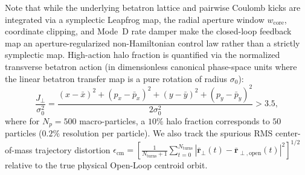 \documentclass[11pt,a4paper]{article}
\begin{document}
Note that while the underlying betatron lattice and pairwise Coulomb kicks are integrated via a symplectic Leapfrog map, the radial aperture window $w_{\mathrm{core}}$, coordinate clipping, and Mode~D rate damper make the closed-loop feedback map an aperture-regularized non-Hamiltonian control law rather than a strictly symplectic map. High-action halo fraction is quantified via the normalized transverse betatron action (in dimensionless canonical phase-space units where the linear betatron transfer map is a pure rotation of radius $\sigma_0$):
\begin{equation}
    \frac{J_\perp}{\sigma_0^2} = \frac{(x - \bar{x})^2 + (p_x - \bar{p}_x)^2 + (y - \bar{y})^2 + (p_y - \bar{p}_y)^2}{2\sigma_0^2} > 3.5,
    \label{eq:halo_action_def}
\end{equation}
where for $N_p = 500$ macro-particles, a $10\%$ halo fraction corresponds to $50$ particles ($0.2\%$ resolution per particle). We also track the spurious RMS center-of-mass trajectory distortion $\epsilon_{\mathrm{cm}} = [\frac{1}{N_{\mathrm{turns}}+1}\sum_{t=0}^{N_{\mathrm{turns}}} |\bar{\bm{r}}_\perp(t) - \bar{\bm{r}}_{\perp,\mathrm{open}}(t)|^2]^{1/2}$ relative to the true physical Open-Loop centroid orbit.
\end{document}
